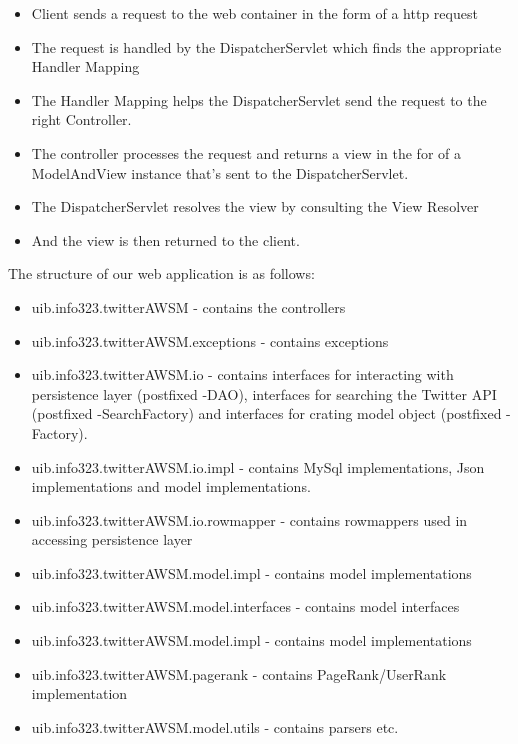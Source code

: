 \begin{itemize}
\item Client sends a request to the web container in the form of a http request
\item The request is handled by the DispatcherServlet which finds the appropriate Handler Mapping
\item The Handler Mapping helps the DispatcherServlet send the request to the right Controller. 
\item The controller processes the request and returns a view in the for of a ModelAndView instance that's sent to the DispatcherServlet. 
\item The DispatcherServlet resolves the view by consulting the View Resolver
\item And the view is then returned to the client. 
\end{itemize}

The structure of our web application is as follows:

\begin{itemize}
  \item uib.info323.twitterAWSM - contains the controllers
  \item uib.info323.twitterAWSM.exceptions - contains exceptions
  \item uib.info323.twitterAWSM.io - contains interfaces for interacting with persistence layer (postfixed -DAO), interfaces for searching the Twitter API (postfixed -SearchFactory) and interfaces for crating model object (postfixed -Factory).
  \item uib.info323.twitterAWSM.io.impl - contains MySql implementations, Json implementations and model implementations. 
  \item uib.info323.twitterAWSM.io.rowmapper - contains rowmappers used in accessing persistence layer
  \item uib.info323.twitterAWSM.model.impl - contains model implementations
  \item uib.info323.twitterAWSM.model.interfaces - contains model interfaces
  \item uib.info323.twitterAWSM.model.impl - contains model implementations
  \item uib.info323.twitterAWSM.pagerank - contains PageRank/UserRank implementation
  \item uib.info323.twitterAWSM.model.utils - contains parsers etc.
\end{itemize}

